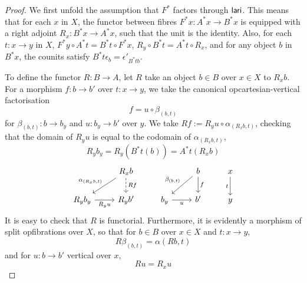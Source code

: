 \begin{proof}
  We first unfold the assumption that $F^*$ factors through $\mathsf{lari}$.
  This means that for each $x$ in $X$,
  the functor between fibres $F^* x : A^* x \to B^* x$
  is equipped with a right adjoint $R_x : B^* x \to A^* x$,
  such that the unit is the identity.
  Also, for each $t : x \to y$ in $X$,
  $F^* y \circ A^* t = B^* t \circ F^* x$, $R_y \circ B^* t = A^* t \circ R_x$,
  and for any object $b$ in $B^* x$,
  the counits satisfy
  $B^* t \epsilon_b = \epsilon'_{B^* t b}$.
  
  To define the functor $R : B \to A$,
  let $R$ take an object $b \in B$ over $x \in X$ to $R_x b$.
  For a morphism $f: b \to b'$ over $t : x \to y$,
  we take the canonical opcartesian-vertical factorisation
  \[ f = u \circ \beta_{(b,t)}\]
  for $\beta_{(b,t)} : b \to b_y$
  and $u : b_y \to b'$ over $y$.
  We take $R f := R_y u \circ \alpha_{(R_x b,t)}$,
  checking that the domain of $R_y u$
  is equal to the codomain of $\alpha_{(R_x b,t)}$,
  \[R_y b_y = R_y (B^* t (b)) = A^* t (R_x b)\]
  \[\begin{tikzcd}
    & {R_x b} && b & x \\
    {R_y b_y} & {R_y b'} & {b_y} & {b'} & y
    \arrow["{\alpha_{(R_x b,t)}}"', from=1-2, to=2-1]
    \arrow["{R f}", dashed, from=1-2, to=2-2]
    \arrow["{\beta_{(b,t)}}"', from=1-4, to=2-3]
    \arrow["f", from=1-4, to=2-4]
    \arrow["t"', from=1-5, to=2-5]
    \arrow["{R_y u}"', from=2-1, to=2-2]
    \arrow["u"', from=2-3, to=2-4]
  \end{tikzcd}\]
  It is easy to check that $R$ is functorial.
  Furthermore, it is evidently a morphism of split opfibrations over $X$,
  so that for $b \in B$ over $x \in X$ and $t : x \to y$,
  \[R \beta_{(b,t)} = \alpha{(R b,t)}\]
  and for $u : b \to b'$ vertical over $x$,
  \[R u = R_x u\]


\end{proof}
